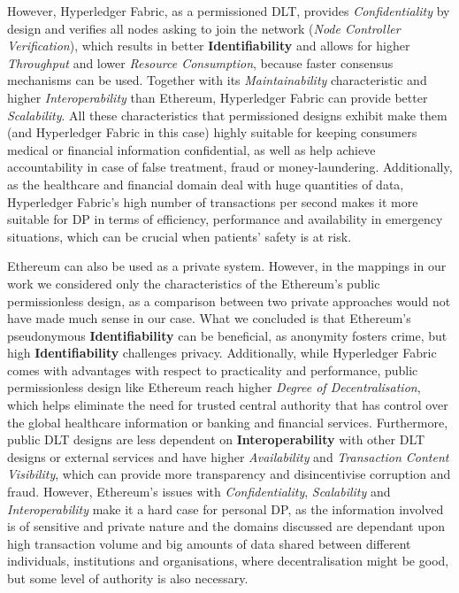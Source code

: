 However, Hyperledger Fabric, as a permissioned DLT, provides \textit{Confidentiality} by design and verifies all nodes asking to join the network (\textit{Node Controller Verification}), which results in better \textbf{Identifiability} and allows for higher \textit{Throughput} and lower \textit{Resource Consumption}, because faster consensus mechanisms can be used. Together with its \textit{Maintainability} characteristic and higher \textit{Interoperability} than Ethereum, Hyperledger Fabric can provide better \textit{Scalability}. All these characteristics that permissioned designs exhibit make them (and Hyperledger Fabric in this case) highly suitable for keeping consumers medical or financial information confidential, as well as help achieve accountability in case of false treatment, fraud or money-laundering. Additionally, as the healthcare and financial domain deal with huge quantities of data, Hyperledger Fabric's high number of transactions per second makes it more suitable for DP in terms of efficiency, performance and availability in emergency situations, which can be crucial when patients' safety is at risk.

Ethereum can also be used as a private system. However, in the mappings in our work we considered only the characteristics of the Ethereum's public permissionless design, as a comparison between two private approaches would not have made much sense in our case. What we concluded is that Ethereum's pseudonymous \textbf{Identifiability} can be beneficial, as anonymity fosters crime, but high \textbf{Identifiability} challenges privacy. Additionally, while Hyperledger Fabric comes with advantages with respect to practicality and performance, public permissionless design like Ethereum reach higher \textit{Degree of Decentralisation}, which helps eliminate the need for trusted central authority that has control over the global healthcare information or banking and financial services. Furthermore, public DLT designs are less dependent on \textbf{Interoperability} with other DLT designs or external services and have higher \textit{Availability} and \textit{Transaction Content Visibility}, which can provide more transparency and disincentivise corruption and fraud. However, Ethereum's issues with \textit{Confidentiality}, \textit{Scalability} and \textit{Interoperability} make it a hard case for personal DP, as the information involved is of sensitive and private nature and the domains discussed are dependant upon high transaction volume and big amounts of data shared between different individuals, institutions and organisations, where decentralisation might be good, but some level of authority is also necessary.

